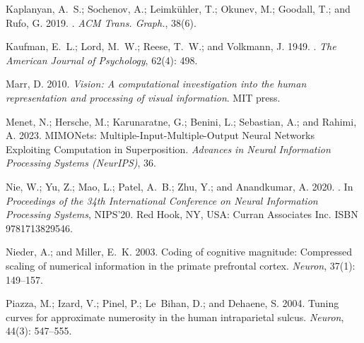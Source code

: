 \documentclass[letterpaper]{article} %
\begin{document}
\begin{thebibliography}{33}
    Kaplanyan, A.~S.; Sochenov, A.; Leimk{\"{u}}hler, T.; Okunev, M.; Goodall, T.;
      and Rufo, G. 2019.
    .
    \newblock \emph{ACM Trans. Graph.}, 38(6).

    Kaufman, E.~L.; Lord, M.~W.; Reese, T.~W.; and Volkmann, J. 1949.
    .
    \newblock \emph{The American Journal of Psychology}, 62(4): 498.

    Marr, D. 2010.
    \newblock \emph{Vision: A computational investigation into the human
      representation and processing of visual information}.
    \newblock MIT press.

    Menet, N.; Hersche, M.; Karunaratne, G.; Benini, L.; Sebastian, A.; and Rahimi,
      A. 2023.
    \newblock MIMONets: Multiple-Input-Multiple-Output Neural Networks Exploiting
      Computation in Superposition.
    \newblock \emph{Advances in Neural Information Processing Systems (NeurIPS)},
      36.

    Nie, W.; Yu, Z.; Mao, L.; Patel, A.~B.; Zhu, Y.; and Anandkumar, A. 2020.
    .
    \newblock In \emph{Proceedings of the 34th International Conference on Neural
      Information Processing Systems}, NIPS'20. Red Hook, NY, USA: Curran
      Associates Inc.
    \newblock ISBN 9781713829546.

    Nieder, A.; and Miller, E.~K. 2003.
    \newblock Coding of cognitive magnitude: Compressed scaling of numerical
      information in the primate prefrontal cortex.
    \newblock \emph{Neuron}, 37(1): 149--157.

    Piazza, M.; Izard, V.; Pinel, P.; Le~Bihan, D.; and Dehaene, S. 2004.
    \newblock Tuning curves for approximate numerosity in the human intraparietal
      sulcus.
    \newblock \emph{Neuron}, 44(3): 547--555.


\end{thebibliography}
\end{document}
